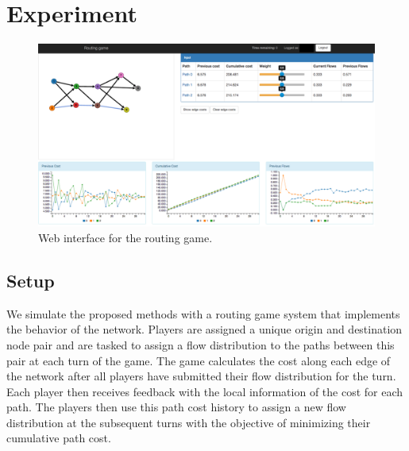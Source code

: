 \documentclass{sig-alternate-ipsn13}
\begin{document}
\section{Experiment}
\label{sec:experiment}

\begin{figure}
  \centering
  \includegraphics[width=160mm]{images/user_interface}
  \caption{Web interface for the routing game.}
  \label{fig:web_interface}
\end{figure}
\subsection{Setup}

We simulate the proposed methods with a routing game system that implements the behavior of the network. Players are assigned a unique origin and destination node pair and are tasked to assign a flow distribution to the paths between this pair at each turn of the game. The game calculates the cost along each edge of the network after all players have submitted their flow distribution for the turn. Each player then receives feedback with the local information of the cost for each path. The players then use this path cost history to assign a new flow distribution at the subsequent turns with the objective of minimizing their cumulative path cost.

\end{document}
